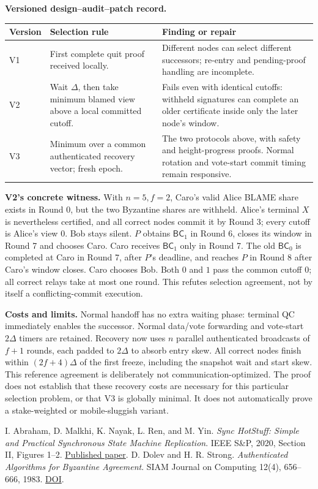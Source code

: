 \documentclass[10pt,a4paper]{article}
\newcommand{\BC}{\mathsf{BC}}
\begin{document}
\textbf{Versioned design--audit--patch record.}
\begin{tabularx}{\linewidth}{@{}p{.1\linewidth}p{.37\linewidth}Y@{}}
\toprule
Version & Selection rule & Finding or repair\\\midrule
V1 & First complete quit proof received locally. & Different nodes can
select different successors; re-entry and pending-proof handling are incomplete.\\
V2 & Wait $\Delta$, then take minimum blamed view above a local committed
cutoff. & Fails even with identical cutoffs: withheld signatures can complete
an older certificate inside only the later node's window.\\
V3 & Minimum over a common authenticated recovery vector; fresh epoch. &
The two protocols above, with safety and height-progress proofs. Normal
rotation and vote-start commit timing remain responsive.\\\bottomrule
\end{tabularx}

\textbf{V2's concrete witness.} With $n=5,f=2$, Caro's valid Alice BLAME
share exists in Round 0, but the two Byzantine shares are withheld. Alice's
terminal $X$ is nevertheless certified, and all correct nodes commit it
by Round 3; every cutoff is Alice's view 0. Bob stays silent. $P$ obtains
$\BC_1$ in Round 6, closes its window in Round 7 and chooses Caro. Caro
receives $\BC_1$ only in Round 7. The old $\BC_0$ is completed at Caro in
Round 7, after $P$'s deadline, and reaches $P$ in Round 8 after Caro's
window closes. Caro chooses Bob. Both $0$ and $1$ pass the common cutoff 0;
all correct relays take at most one round. This refutes selection agreement,
not by itself a conflicting-commit execution.

\textbf{Costs and limits.} Normal handoff has no extra waiting phase:
terminal QC immediately enables the successor. Normal data/vote forwarding
and vote-start $2\Delta$ timers are retained. Recovery now uses $n$ parallel
authenticated broadcasts of $f+1$ rounds, each padded to $2\Delta$ to absorb
entry skew. All correct nodes finish within
$(2f+4)\Delta$ of the first freeze, including the snapshot wait and start
skew. This reference agreement is deliberately not communication-optimized.
The proof does not establish that these recovery costs are necessary for
this particular selection problem, or that V3 is globally minimal. It does
not automatically prove a stake-weighted or mobile-sluggish variant.

\begin{thebibliography}{2}\small
{} I. Abraham, D. Malkhi, K. Nayak, L. Ren, and M. Yin.
\emph{Sync HotStuff: Simple and Practical Synchronous State Machine Replication}.
IEEE S\&P, 2020, Section II, Figures 1--2.
\href{https://conferences.computer.org/sp/pdfs/sp/2020/349700a106.pdf}{Published paper}.
 D. Dolev and H. R. Strong.
\emph{Authenticated Algorithms for Byzantine Agreement}.
SIAM Journal on Computing 12(4), 656--666, 1983.
\href{https://doi.org/10.1137/0212045}{DOI}.
\end{thebibliography}
\end{document}
